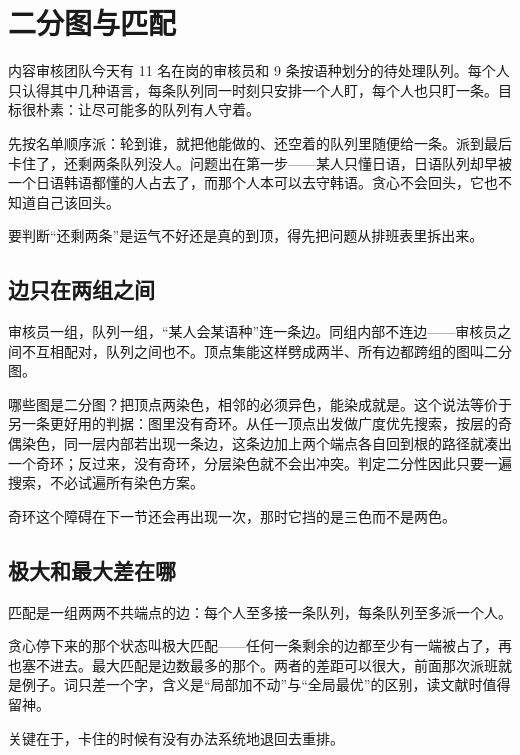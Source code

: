 \section{二分图与匹配}
\label{sec:04-Discrete-Mathematics/03-Graph-Theory/04}

内容审核团队今天有 11 名在岗的审核员和 9 条按语种划分的待处理队列。每个人只认得其中几种语言，每条队列同一时刻只安排一个人盯，每个人也只盯一条。目标很朴素：让尽可能多的队列有人守着。

先按名单顺序派：轮到谁，就把他能做的、还空着的队列里随便给一条。派到最后卡住了，还剩两条队列没人。问题出在第一步——某人只懂日语，日语队列却早被一个日语韩语都懂的人占去了，而那个人本可以去守韩语。贪心不会回头，它也不知道自己该回头。

要判断``还剩两条''是运气不好还是真的到顶，得先把问题从排班表里拆出来。

\subsection{边只在两组之间}

审核员一组，队列一组，``某人会某语种''连一条边。同组内部不连边——审核员之间不互相配对，队列之间也不。顶点集能这样劈成两半、所有边都跨组的图叫二分图。

哪些图是二分图？把顶点两染色，相邻的必须异色，能染成就是。这个说法等价于另一条更好用的判据：图里没有奇环。从任一顶点出发做广度优先搜索，按层的奇偶染色，同一层内部若出现一条边，这条边加上两个端点各自回到根的路径就凑出一个奇环；反过来，没有奇环，分层染色就不会出冲突。判定二分性因此只要一遍搜索，不必试遍所有染色方案。

奇环这个障碍在下一节还会再出现一次，那时它挡的是三色而不是两色。

\subsection{极大和最大差在哪}

匹配是一组两两不共端点的边：每个人至多接一条队列，每条队列至多派一个人。

贪心停下来的那个状态叫极大匹配——任何一条剩余的边都至少有一端被占了，再也塞不进去。最大匹配是边数最多的那个。两者的差距可以很大，前面那次派班就是例子。词只差一个字，含义是``局部加不动''与``全局最优''的区别，读文献时值得留神。

关键在于，卡住的时候有没有办法系统地退回去重排。


